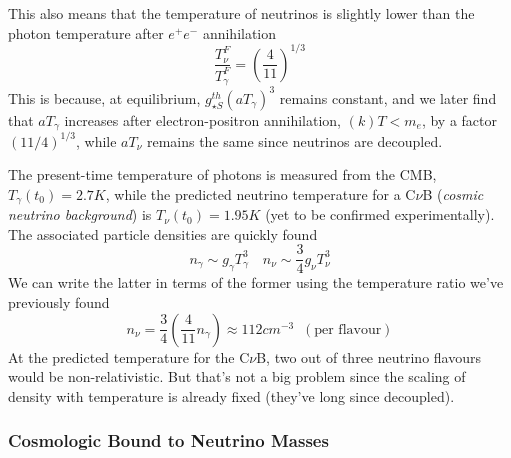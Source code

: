 This also means that the temperature of neutrinos is slightly lower than the photon temperature after $e^{+}e^{-}$ annihilation
\begin{equation}
    \boxed{
        \frac{T_{\nu}^{F}}{T_{\gamma}^{F}} = \left(\frac{4}{11}\right)^{1/3}
    }
\end{equation}
This is because, at equilibrium, $g_{\star S}^{th}(aT_{\gamma})^{3}$ remains constant, and we later find that $aT_{\gamma}$ increases after electron-positron annihilation, $(k)T < m_{e}$, by a factor $(11/4)^{1/3}$, while $aT_{\nu}$ remains the same since neutrinos are decoupled.
\par The present-time temperature of photons is measured from the CMB, $T_{\gamma}(t_{0}) = 2.7\unit{K}$, while the predicted neutrino temperature for a C$\nu$B (\emph{cosmic neutrino background}) is $T_{\nu}(t_{0}) = 1.95\unit{K}$ (yet to be confirmed experimentally). The associated particle densities are quickly found 
\begin{equation}
    n_{\gamma} \sim g_{\gamma}T_{\gamma}^{3} \quad n_{\nu} \sim \frac{3}{4}g_{\nu}T_{\nu}^{3}
\end{equation}
We can write the latter in terms of the former using the temperature ratio we've previously found
\begin{equation}
    n_{\nu} = \frac{3}{4}\left(\frac{4}{11}n_{\gamma}\right) \approx 112 \unit{cm}^{-3} \;\; (\text{per flavour})
\end{equation}
At the predicted temperature for the C$\nu$B, two out of three neutrino flavours would be non-relativistic. But that's not a big problem since the scaling of density with temperature is already fixed (they've long since decoupled).

\subsubsection{Cosmologic Bound to Neutrino Masses}

